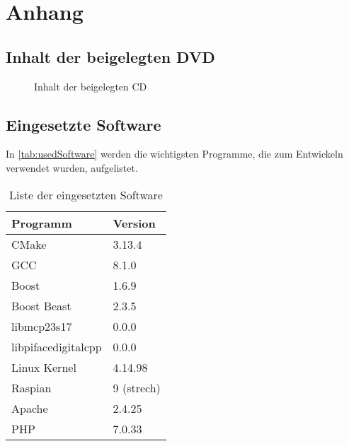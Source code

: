 \section{Anhang}\label{chp:anhang}
\subsection*{Inhalt der beigelegten DVD}
\begin{figure}[H]

\caption{Inhalt der beigelegten CD}
\label{fig:cd}
\end{figure}

\subsection*{Eingesetzte Software}

In \autoref{tab:usedSoftware} werden die wichtigsten Programme, die zum Entwickeln verwendet wurden, aufgelistet.

\begin{table}[H]
\centering
\caption{Liste der eingesetzten Software}
\label{tab:usedSoftware}
\begin{tabular}{ll}
\hline
Programm       & Version      \\ \hline
CMake          & 3.13.4       \\
GCC            & 8.1.0        \\
Boost		   & 1.6.9		  \\
Boost Beast	   & 2.3.5		  \\
libmcp23s17    & 0.0.0		  \\
libpifacedigitalcpp & 0.0.0  \\
Linux Kernel   & 4.14.98      \\
Raspian 	   & 9 (strech)   \\
Apache 		   & 2.4.25       \\
PHP			   & 7.0.33		  \\

\end{tabular}
\end{table}

